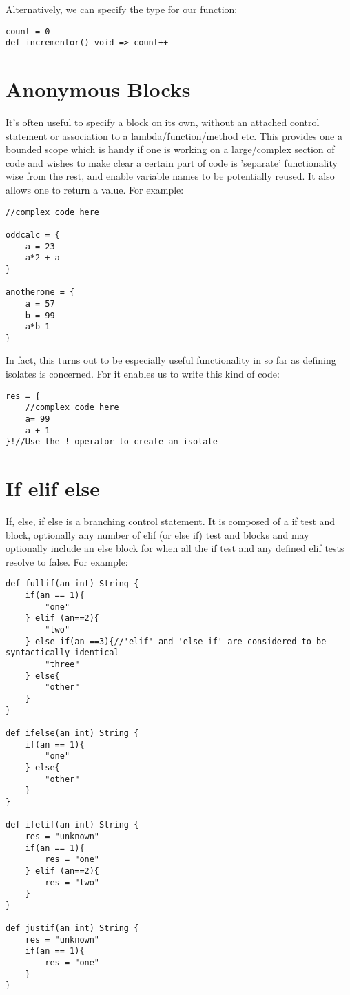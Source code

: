 \documentclass[conc-doc]{subfiles}
\begin{document}
Alternatively, we can specify the type for our function:
\begin{lstlisting}
count = 0
def incrementor() void => count++
\end{lstlisting}

\section{Anonymous Blocks}
It's often useful to specify a block on its own, without an attached control statement or association to a lambda/function/method etc. This provides one a bounded scope which is handy if one is working on a large/complex section of code and wishes to make clear a certain part of code is 'separate' functionality wise from the rest, and enable variable names to be potentially reused. It also allows one to return a value. For example:

\begin{lstlisting}
//complex code here

oddcalc = {
	a = 23
	a*2 + a
}

anotherone = {
	a = 57
	b = 99
	a*b-1
}
\end{lstlisting}

In fact, this turns out to be especially useful functionality in so far as defining isolates is concerned. For it enables us to write this kind of code:
\begin{lstlisting}
res = {
	//complex code here
	a= 99
	a + 1
}!//Use the ! operator to create an isolate
\end{lstlisting}

\section{If elif else}
If, else, if else is a branching control statement. It is composed of a if test and block, optionally any number of elif  (or else if) test and blocks and may optionally include an else block for when all the if test and any defined elif tests resolve to false. For example:

\begin{lstlisting}
def fullif(an int) String {
	if(an == 1){
		"one"
	} elif (an==2){
		"two"
	} else if(an ==3){//'elif' and 'else if' are considered to be syntactically identical
		"three"
	} else{
		"other"
	}
}

def ifelse(an int) String {
	if(an == 1){
		"one"
	} else{
		"other"
	}
}

def ifelif(an int) String {
	res = "unknown"
	if(an == 1){
		res = "one"
	} elif (an==2){
		res = "two"
	}
}

def justif(an int) String {
	res = "unknown"
	if(an == 1){
		res = "one"
	}
}
\end{lstlisting}
\end{document}
